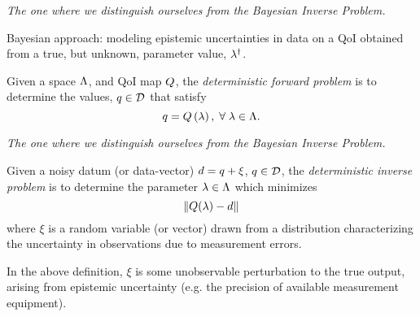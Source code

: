 \begin{frame}[t]{\it The one where we distinguish ourselves from the Bayesian Inverse Problem.}

Bayesian approach: modeling epistemic uncertainties in data on a QoI obtained from a true, but unknown, parameter value, $\lambda^\dagger$.

\vskip 10pt

\begin{defn}
  Given a space ${\Lambda}$, and QoI map $Q$, the \emph{deterministic forward problem} is to determine the values, $q \in \mathcal{D}$ that satisfy
  \begin{equation}
    q = Q\left ( \lambda \right ), \; \forall \; \lambda \in {\Lambda}.
  \end{equation}
\end{defn}


\end{frame}


\begin{frame}[t]{\it The one where we distinguish ourselves from the Bayesian Inverse Problem.}
\begin{defn}
  Given a noisy datum (or data-vector) $d = q + \xi$, $q \in \mathcal{D}$, the \emph{deterministic inverse problem} is to determine the parameter $\lambda \in {\Lambda}$ which minimizes
  \begin{equation}
    \left\Vert Q(\lambda) - d\right\Vert
  \end{equation}
  where $\xi$ is a random variable (or vector) drawn from a distribution characterizing the uncertainty in observations due to measurement errors.
\end{defn}

In the above definition, $\xi$ is some unobservable perturbation to the true output, arising from epistemic uncertainty (e.g. the precision of available measurement equipment).

\end{frame}


